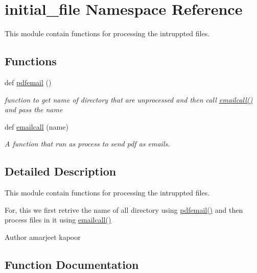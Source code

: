 \hypertarget{namespaceinitial__file}{}\section{initial\+\_\+file Namespace Reference}
\label{namespaceinitial__file}


This module contain functions for processing the intruppted files.  


\subsection*{Functions}
\begin{DoxyCompactItemize}
\item 
def \hyperlink{namespaceinitial__file_a105b1aa7bf4db853b6f4d064ed224030}{pdfemail} ()
\begin{DoxyCompactList}\small\item\em function to get name of directory that are unprocessed and then call \hyperlink{namespaceinitial__file_ad9d26ace18fc618ee70df3c0c94927b7}{emailcall()} and pass the name \end{DoxyCompactList}\item 
def \hyperlink{namespaceinitial__file_ad9d26ace18fc618ee70df3c0c94927b7}{emailcall} (name)
\begin{DoxyCompactList}\small\item\em A function that run as process to send pdf as emails. \end{DoxyCompactList}\end{DoxyCompactItemize}


\subsection{Detailed Description}
This module contain functions for processing the intruppted files. 

For, this we first retrive the name of all directory using \hyperlink{namespaceinitial__file_a105b1aa7bf4db853b6f4d064ed224030}{pdfemail()} and then process files in it using \hyperlink{namespaceinitial__file_ad9d26ace18fc618ee70df3c0c94927b7}{emailcall()} \begin{DoxyAuthor}{Author}
amarjeet kapoor 
\end{DoxyAuthor}


\subsection{Function Documentation}
\hypertarget{namespaceinitial__file_ad9d26ace18fc618ee70df3c0c94927b7}{}
